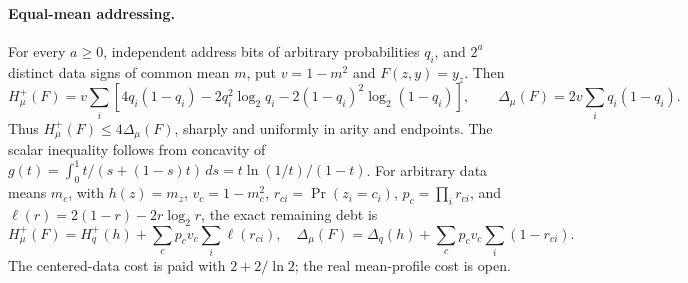 \paragraph{Equal-mean addressing.}
For every $a\ge0$, independent address bits of arbitrary probabilities $q_i$,
and $2^a$ distinct data signs of common mean $m$, put $v=1-m^2$ and $F(z,y)=y_z$.
Then
\[
 H_\mu^+(F)=v\sum_i\left[4q_i(1-q_i)-2q_i^2\log_2q_i
 -2(1-q_i)^2\log_2(1-q_i)\right],\qquad
 \Delta_\mu(F)=2v\sum_iq_i(1-q_i).
\]
Thus $H_\mu^+(F)\le4\Delta_\mu(F)$, sharply and uniformly in arity and endpoints.
The scalar inequality follows from concavity of
$g(t)=\int_0^1 t/(s+(1-s)t)\,ds=t\ln(1/t)/(1-t)$.
For arbitrary data means $m_c$, with $h(z)=m_z$, $v_c=1-m_c^2$,
$r_{ci}=\Pr(z_i=c_i)$, $p_c=\prod_i r_{ci}$, and
$\ell(r)=2(1-r)-2r\log_2r$, the exact remaining debt is
\[
 H_\mu^+(F)=H_q^+(h)+\sum_cp_cv_c\sum_i\ell(r_{ci}),\quad
 \Delta_\mu(F)=\Delta_q(h)+\sum_cp_cv_c\sum_i(1-r_{ci}).
\]
The centered-data cost is paid with $2+2/\ln2$; the real mean-profile cost is open.
